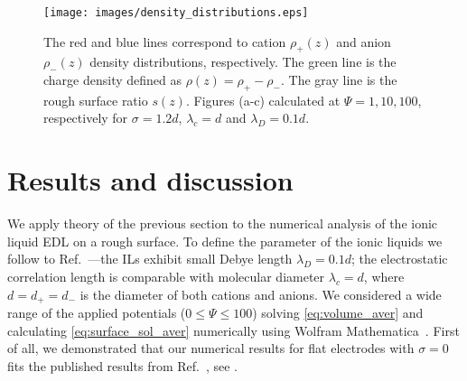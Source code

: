 \begin{figure*}
    \centering
    \texttt{[image: images/density\_distributions.eps]}
    \caption{The red and blue lines correspond to cation $\rho_+(z)$ and anion $\rho_-(z)$ density distributions, respectively. The green line is the charge density defined as $\rho(z)=\rho_+-\rho_-$. The gray line is the rough surface ratio $s(z)$. Figures (a-c) calculated at $\Psi=1, 10, 100$, respectively for $\sigma=1.2d$, $\lambda_c=d$ and $\lambda_D=0.1d$.    }
    \label{fig:densities}
\end{figure*}

\section{Results and discussion}
\label{sec:results}
We apply theory of  the  previous section to the numerical analysis of the ionic liquid EDL on a rough surface. To define the parameter of the ionic liquids we follow to Ref.~\cite{bazant2011double}---the ILs exhibit small Debye length $\lambda_D=0.1 d$; the electrostatic correlation length is comparable with molecular diameter $\lambda_c=d$, where $d=d_+=d_-$ is the diameter of both cations and anions. 
We considered a wide range of the applied potentials ($0\le\Psi\le100$) solving \cref{eq:volume_aver} and calculating \cref{eq:surface_sol_aver} numerically using Wolfram Mathematica~\cite{mathematica2020}. First of all, we demonstrated that our numerical results for flat electrodes with $\sigma=0$ fits the published results from Ref.~\cite{bazant2011double}, see . 

